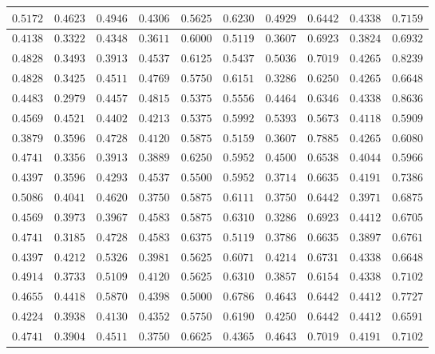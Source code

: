 \begin{longtable}{c|c|c|c|c|c|c|c|c|c}
$0.5172$ & $0.4623$ & $0.4946$ & $0.4306$ & $0.5625$ & $0.6230$ & $0.4929$ & $0.6442$ & $0.4338$ & $0.7159$ \\ \hline
$0.4138$ & $0.3322$ & $0.4348$ & $0.3611$ & $0.6000$ & $0.5119$ & $0.3607$ & $0.6923$ & $0.3824$ & $0.6932$ \\ \hline
$0.4828$ & $0.3493$ & $0.3913$ & $0.4537$ & $0.6125$ & $0.5437$ & $0.5036$ & $0.7019$ & $0.4265$ & $0.8239$ \\ \hline
$0.4828$ & $0.3425$ & $0.4511$ & $0.4769$ & $0.5750$ & $0.6151$ & $0.3286$ & $0.6250$ & $0.4265$ & $0.6648$ \\ \hline
$0.4483$ & $0.2979$ & $0.4457$ & $0.4815$ & $0.5375$ & $0.5556$ & $0.4464$ & $0.6346$ & $0.4338$ & $0.8636$ \\ \hline
$0.4569$ & $0.4521$ & $0.4402$ & $0.4213$ & $0.5375$ & $0.5992$ & $0.5393$ & $0.5673$ & $0.4118$ & $0.5909$ \\ \hline
$0.3879$ & $0.3596$ & $0.4728$ & $0.4120$ & $0.5875$ & $0.5159$ & $0.3607$ & $0.7885$ & $0.4265$ & $0.6080$ \\ \hline
$0.4741$ & $0.3356$ & $0.3913$ & $0.3889$ & $0.6250$ & $0.5952$ & $0.4500$ & $0.6538$ & $0.4044$ & $0.5966$ \\ \hline
$0.4397$ & $0.3596$ & $0.4293$ & $0.4537$ & $0.5500$ & $0.5952$ & $0.3714$ & $0.6635$ & $0.4191$ & $0.7386$ \\ \hline
$0.5086$ & $0.4041$ & $0.4620$ & $0.3750$ & $0.5875$ & $0.6111$ & $0.3750$ & $0.6442$ & $0.3971$ & $0.6875$ \\ \hline
$0.4569$ & $0.3973$ & $0.3967$ & $0.4583$ & $0.5875$ & $0.6310$ & $0.3286$ & $0.6923$ & $0.4412$ & $0.6705$ \\ \hline
$0.4741$ & $0.3185$ & $0.4728$ & $0.4583$ & $0.6375$ & $0.5119$ & $0.3786$ & $0.6635$ & $0.3897$ & $0.6761$ \\ \hline
$0.4397$ & $0.4212$ & $0.5326$ & $0.3981$ & $0.5625$ & $0.6071$ & $0.4214$ & $0.6731$ & $0.4338$ & $0.6648$ \\ \hline
$0.4914$ & $0.3733$ & $0.5109$ & $0.4120$ & $0.5625$ & $0.6310$ & $0.3857$ & $0.6154$ & $0.4338$ & $0.7102$ \\ \hline
$0.4655$ & $0.4418$ & $0.5870$ & $0.4398$ & $0.5000$ & $0.6786$ & $0.4643$ & $0.6442$ & $0.4412$ & $0.7727$ \\ \hline
$0.4224$ & $0.3938$ & $0.4130$ & $0.4352$ & $0.5750$ & $0.6190$ & $0.4250$ & $0.6442$ & $0.4412$ & $0.6591$ \\ \hline
$0.4741$ & $0.3904$ & $0.4511$ & $0.3750$ & $0.6625$ & $0.4365$ & $0.4643$ & $0.7019$ & $0.4191$ & $0.7102$ \\ \hline

\end{longtable}
